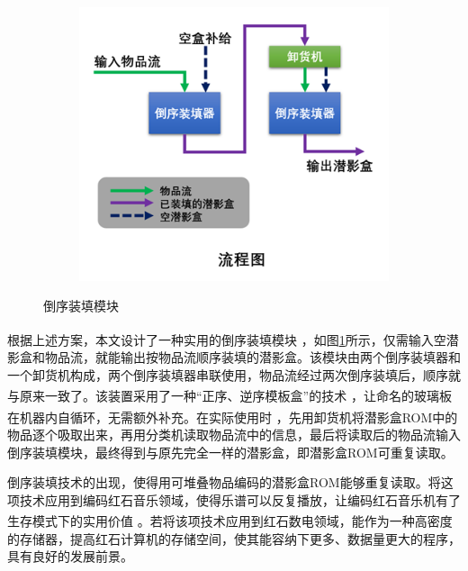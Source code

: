 \documentclass[UTF8,12pt,punct=kaiming,fontset=none]{ctexart}
\newcommand*{\upcite}[1]{
    \textsuperscript{\cite{#1}}
}
\begin{document}
\begin{figure}
\begin{subfigure}{0.45\linewidth}
    \end{subfigure}
    \hspace{1cm}
    \begin{subfigure}{0.45\linewidth}
        \centering
        \includegraphics[width=\linewidth]{图片3.png}
        
    \end{subfigure}
    \caption{倒序装填模块}
    \label{fig:2}
\end{figure}

根据上述方案，本文设计了一种实用的倒序装填模块\upcite{ref4}，如图\ref{fig:2}所示，仅需输入空潜影盒和物品流，就能输出按物品流顺序装填的潜影盒。该模块由两个倒序装填器和一个卸货机构成，两个倒序装填器串联使用，物品流经过两次倒序装填后，顺序就与原来一致了。该装置采用了一种“正序、逆序模板盒”的技术\upcite{ref5}，让命名的玻璃板在机器内自循环，无需额外补充。在实际使用时\upcite{ref2,ref6}，先用卸货机将潜影盒ROM中的物品逐个吸取出来，再用分类机读取物品流中的信息，最后将读取后的物品流输入倒序装填模块，最终得到与原先完全一样的潜影盒，即潜影盒ROM可重复读取。

倒序装填技术的出现，使得用可堆叠物品编码的潜影盒ROM能够重复读取。将这项技术应用到编码红石音乐领域，使得乐谱可以反复播放，让编码红石音乐机有了生存模式下的实用价值\upcite{ref6}。若将该项技术应用到红石数电领域，能作为一种高密度的存储器，提高红石计算机的存储空间，使其能容纳下更多、数据量更大的程序，具有良好的发展前景。



\end{document}
